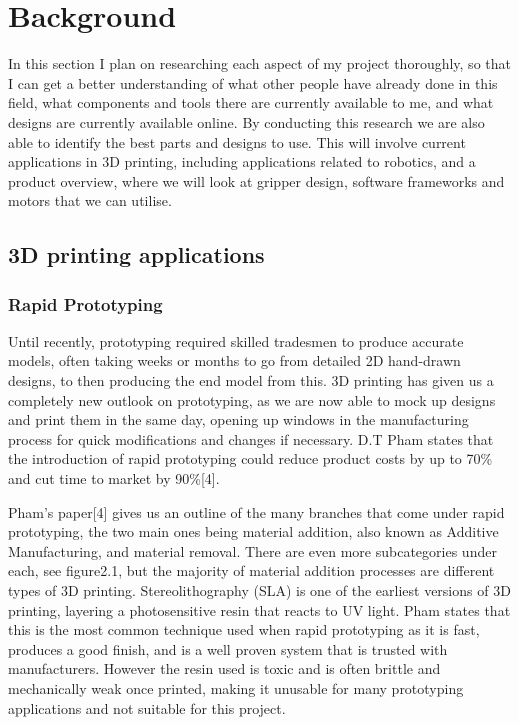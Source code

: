 \documentclass{l4proj}
\begin{document}
\chapter{Background}
In this section I plan on researching each aspect of my project thoroughly, so that I can get a better understanding of what other people have already done in this field, what components and tools there are currently available to me, and what designs are currently available online. By conducting this research we are also able to identify the best parts and designs to use.  This will involve current applications in 3D printing, including applications related to robotics, and a product overview, where we will look at gripper design, software frameworks and motors that we can utilise. 

\section{3D printing applications}
\subsection{Rapid Prototyping}
Until recently, prototyping required skilled tradesmen to produce accurate models, often taking weeks or months to go from detailed 2D hand-drawn designs, to then producing the end model from this. 3D printing has given us a completely new outlook on prototyping, as we are now able to mock up designs and print them in the same day, opening up windows in the manufacturing process for quick modifications and changes if necessary. D.T Pham states that the introduction of rapid prototyping could reduce product costs by up to 70\% and cut time to market by 90\%[4]. 

Pham's paper[4] gives us an outline of the many branches that come under rapid prototyping, the two main ones being material addition, also known as Additive Manufacturing, and material removal. There are even more subcategories under each, see figure2.1, but the majority of material addition processes are different types of 3D printing. Stereolithography (SLA) is one of the earliest versions of 3D printing, layering a photosensitive resin that reacts to UV light. Pham states that this is the most common technique used when rapid prototyping as it is fast, produces a good finish, and is a well proven system that is trusted with manufacturers. However the resin used is toxic and is often brittle and mechanically weak once printed, making it unusable for many prototyping applications and not suitable for this project.
\end{document}
